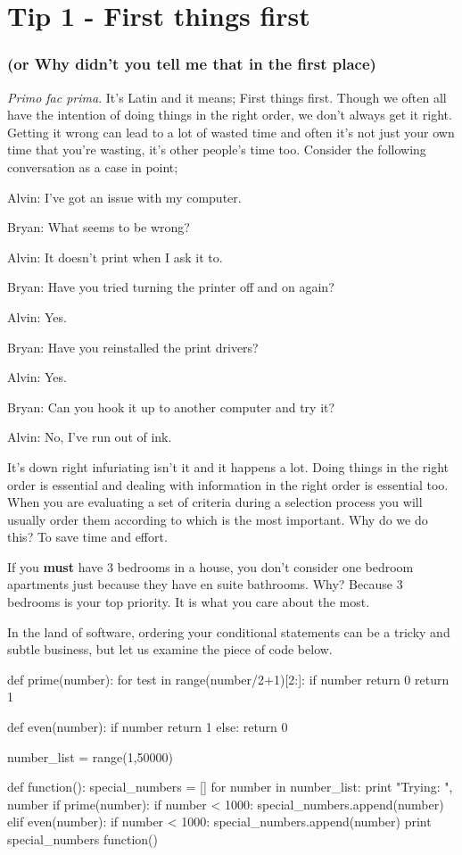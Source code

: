 \chapter{Tip 1 - First things first}
\subsection{(or Why didn't you tell me that in the first place)}

\textit{Primo fac prima}. It's Latin and it means; First things first. 
Though we often all have the intention of doing things in the right order, we don't always get it right.
Getting it wrong can lead to a lot of wasted time and often it's not just your own time that you're wasting, it's other people's time too.
Consider the following conversation as a case in point;

\begin{trenches}
Alvin: I've got an issue with my computer.

Bryan: What seems to be wrong?

Alvin: It doesn't print when I ask it to.

Bryan: Have you tried turning the printer off and on again?

Alvin: Yes.

Bryan: Have you reinstalled the print drivers?

Alvin: Yes.

Bryan: Can you hook it up to another computer and try it?

Alvin: No, I've run out of ink.
\end{trenches}

It's down right infuriating isn't it and it happens a lot.
Doing things in the right order is essential and dealing with information in the right order is essential too.
When you are evaluating a set of criteria during a selection process you will usually order them according to which is the most important.
Why do we do this? To save time and effort.

If you \textbf{must} have 3 bedrooms in a house, you don't consider one bedroom apartments just because they have en suite bathrooms.
Why? Because 3 bedrooms is your top priority. It is what you care about the most.

In the land of software, ordering your conditional statements can be a tricky and subtle business, but let us examine the piece of code below.

\begin{code}
def prime(number):
	for test in range(number/2+1)[2:]:
		if number%
			return 0
	return 1

def even(number):
	if number%
		return 1
	else:
		return 0

number_list = range(1,50000)

def function():
	special_numbers = []
	for number in number_list:
		print "Trying: ", number
		if prime(number):
			if number < 1000:
				special_numbers.append(number)
		elif even(number):
			if number < 1000:
				special_numbers.append(number)
	print special_numbers
function()
\end{code}

